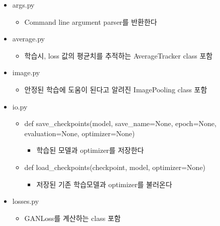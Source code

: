 \begin{itemize}
	\item args.py
	\begin{itemize}
		\item Command line argument parser를 반환한다
	\end{itemize}
	\item average.py
	\begin{itemize}
		\item 학습시, loss 값의 평균치를 추적하는 AverageTracker class 포함
	\end{itemize}
	\item image.py
	\begin{itemize}
		\item 안정된 학습에 도움이 된다고 알려진 ImagePooling class 포함
	\end{itemize}
	\item io.py
	\begin{itemize}
		\item def save\_checkpoints(model,
		save\_name=None,
		epoch=None,
		evaluation=None,
		optimizer=None)
		\begin{itemize}
			\item 학습된 모델과 optimizer를 저장한다
		\end{itemize}
		\item def load\_checkpoints(checkpoint, model, optimizer=None)
		\begin{itemize}
			\item 저장된 기존 학습모델과 optimizer를 불러온다
		\end{itemize}
	\end{itemize}
	\item losses.py
	\begin{itemize}
		\item GANLoss를 계산하는 class 포함
	\end{itemize}
\end{itemize}